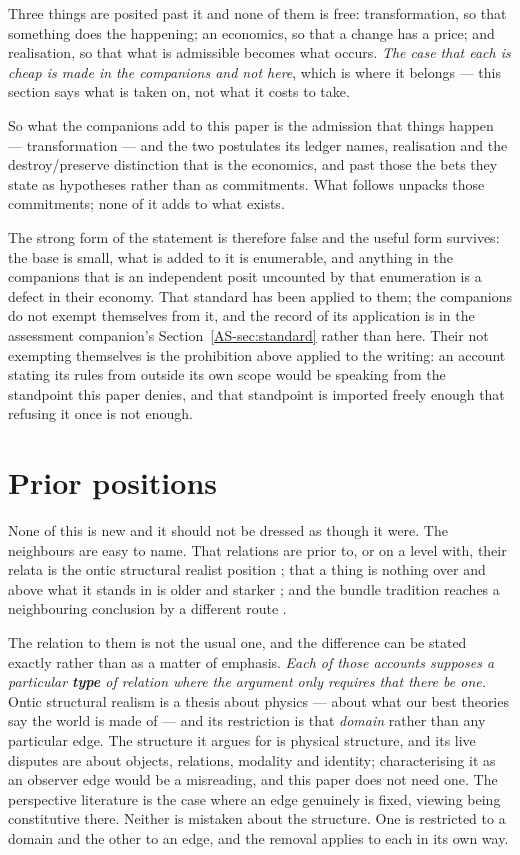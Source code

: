 \documentclass[11pt,a4paper]{article}
\theoremstyle{remark}\newtheorem{remark}[proposition]{Remark}
\begin{document}
Three things are posited past it and none of them is free: transformation, so that something does the
happening; an economics, so that a change has a price; and realisation, so that what is admissible
becomes what occurs. \emph{The case that each is cheap is made in the companions and not here}, which
is where it belongs --- this section says what is taken on, not what it costs to take.

So what the companions add to this paper is the admission that things happen --- transformation ---
and the two postulates its ledger names, realisation and the destroy\slash preserve distinction that is
the economics, and past those the bets they state as hypotheses rather than as commitments. What
follows unpacks those commitments; none of it adds to what exists.

The strong form of the statement is therefore false and the useful form survives: the base is small,
what is added to it is enumerable, and anything in the companions that is an independent posit
uncounted by that enumeration is a defect in their economy. That standard has been applied to them; the companions do not exempt themselves from it, and the
record of its application is in the assessment companion's Section~\ref{AS-sec:standard} rather than
here. Their not exempting themselves is the
prohibition above applied to the writing: an account stating its rules from outside its own scope would
be speaking from the standpoint this paper denies, and that standpoint is imported freely enough that
refusing it once is not enough.

\section{Prior positions}\label{sec:prior}
None of this is new and it should not be dressed as though it were. The neighbours are easy to name.
That relations are prior to, or on a level with, their relata is the ontic structural realist position
\citep{ladymanross2007,esfeld2004}; that a thing is nothing over and above what it stands in is older
and starker \citep{nagarjuna1995}; and the bundle tradition reaches a neighbouring conclusion by a
different route \citep{dcwilliams1953}.

The relation to them is not the usual one, and the difference can be stated exactly rather than as a
matter of emphasis. \emph{Each of those accounts supposes a particular \textbf{type} of relation where
the argument only requires that there be one.} Ontic structural realism is a thesis about physics --- about what our best theories say the world is
made of --- and its restriction is that \emph{domain} rather than any particular edge. The structure it
argues for is physical structure, and its live disputes are about objects, relations, modality and
identity; characterising it as an observer edge would be a misreading, and this paper does not need
one. The perspective literature is the case where an edge genuinely is fixed, viewing being
constitutive there. Neither is mistaken about the structure. One is restricted to a domain and the
other to an edge, and the removal applies to each in its own way.
\end{document}
